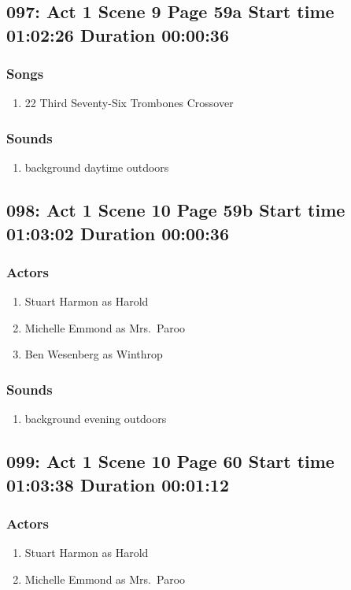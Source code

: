 \subsection{097: Act 1 Scene 9 Page 59a Start time 01:02:26 Duration 00:00:36}
\subsubsection{Songs}
\begin{enumerate}
\item 22 Third Seventy-Six Trombones Crossover
\end{enumerate}\subsubsection{Sounds}
\begin{enumerate}
\item background daytime outdoors
\end{enumerate}
\subsection{098: Act 1 Scene 10 Page 59b Start time 01:03:02 Duration 00:00:36}

\subsubsection{Actors}
\begin{enumerate}
\item Stuart Harmon as Harold
\item Michelle Emmond as Mrs.~Paroo
\item Ben Wesenberg as Winthrop
\end{enumerate}

\subsubsection{Sounds}
\begin{enumerate}
\item background evening outdoors
\end{enumerate}
\subsection{099: Act 1 Scene 10 Page 60 Start time 01:03:38 Duration 00:01:12}

\subsubsection{Actors}
\begin{enumerate}
\item Stuart Harmon as Harold
\item Michelle Emmond as Mrs.~Paroo
\end{enumerate}

